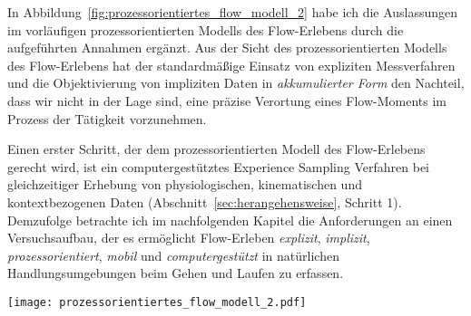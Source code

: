 In Abbildung~\ref{fig:prozessorientiertes_flow_modell_2} habe ich die Auslassungen im vorläufigen prozessorientierten Modells des Flow-Erlebens durch die aufgeführten Annahmen ergänzt. Aus der Sicht des prozessorientierten Modells des Flow-Erlebens hat der standardmäßige Einsatz von expliziten Messverfahren und die Objektivierung von impliziten Daten in \emph{akkumulierter Form} den Nachteil, dass wir nicht in der Lage sind, eine präzise Verortung eines Flow-Moments im Prozess der Tätigkeit vorzunehmen. 

Einen erster Schritt, der dem prozessorientierten Modell des Flow-Erlebens gerecht wird, ist ein computergestütztes Experience Sampling Verfahren bei gleichzeitiger Erhebung von physiologischen, kinematischen und kontextbezogenen Daten (Abschnitt~\ref{sec:herangehensweise}, Schritt 1). Demzufolge betrachte ich im nachfolgenden Kapitel die Anforderungen an einen Versuchsaufbau, der es ermöglicht Flow-Erleben \emph{explizit}, \emph{implizit}, \emph{prozessorientiert}, \emph{mobil} und \emph{computergestützt} in natürlichen Handlungsumgebungen beim Gehen und Laufen zu erfassen.
\begin{sidewaysfigure}
	\texttt{[image: prozessorientiertes\_flow\_modell\_2.pdf]} \caption[Prozessorientiertes Modell des Flow-Erlebens (Erweiterung)]{Prozessorientiertes Modell mit Annahmen zu implizit messbaren Auswirkungen des Flow-Erlebens} \label{fig:prozessorientiertes_flow_modell_2} 
\end{sidewaysfigure}

